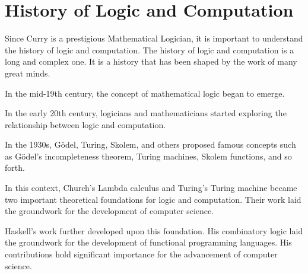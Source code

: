 \section{History of Logic and Computation}
Since Curry is a prestigious Mathematical Logician, it is important to understand the history of logic and computation. The history of logic and computation is a long and complex one. It is a history that has been shaped by the work of many great minds.

In the mid-19th century, the concept of mathematical logic began to emerge.

In the early 20th century, logicians and mathematicians started exploring the relationship between logic and computation.

In the 1930s, Gödel, Turing, Skolem, and others proposed famous concepts such as Gödel's incompleteness theorem, Turing machines, Skolem functions, and so forth.

In this context, Church's Lambda calculus and Turing's Turing machine became two important theoretical foundations for logic and computation. Their work laid the groundwork for the development of computer science.

Haskell's work further developed upon this foundation. His combinatory logic laid the groundwork for the development of functional programming languages. His contributions hold significant importance for the advancement of computer science.